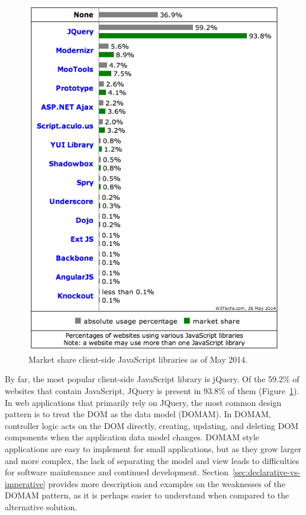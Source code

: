 \begin{figure}
  \centering
  \includegraphics[width=\textwidth,natwidth=610,natheight=642]{images/jquery-marketshare.png}
  \caption{Market share client-side JavaScript libraries as of May 2014. \autocite{w3techs2014javascript}}
  \label{fig:jquery-marketshare}
\end{figure}

By far, the most popular client-side JavaScript library is jQuery. \autocite{w3techs2014javascript}
Of the 59.2\% of websites that contain JavaScript, JQuery is present in 93.8\% of them (Figure~\ref{fig:jquery-marketshare}).
In web applications that primarily rely on JQuery, the most common design pattern is to treat the DOM as the data model (DOMAM).
In DOMAM, controller logic acts on the DOM directly, creating, updating, and deleting DOM components when the application data model changes.
DOMAM style applications are easy to implement for small applications, but as they grow larger and more complex, the lack of separating the model and view leads to difficulties for software maintenance and continued development.
Section~\ref{sec:declarative-vs-imperative} provides more description and examples on the weaknesses of the DOMAM pattern, as it is perhaps easier to understand when compared to the alternative solution.

